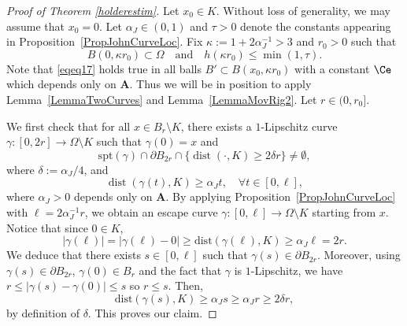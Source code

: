 \documentclass[12pt]{article}
\theoremstyle{definition}
\theoremstyle{remark}
\newtheorem{remark}[theorem]{Remark}
\numberwithin{equation}{section}
\DeclareMathOperator{\dist}{dist}
\newcommand{\dd}{\partial}
\newcommand{\abs}[1]{\lvert #1 \rvert}
\newcommand{\A}{\mathbf{A}}
\newcommand{\spt}{\mathrm{spt}}
\begin{document}
 


\begin{proof}[Proof of Theorem \ref{holderestim}]
    Let $x_0 \in K$. Without loss of generality, we may assume that $x_0 = 0$.
    Let $\alpha_J \in (0,1)$ and $\tau > 0$ denote the constants appearing in Proposition~\ref{PropJohnCurveLoc}.
    Fix $\kappa := 1+2\alpha_J^{-1} > 3$ and $r_0 > 0$ such that
    \begin{equation}
        B(0, \kappa r_0) \subset \Omega \quad \text{and} \quad h(\kappa r_0) \leq \min(1,\tau).
    \end{equation}
    Note that \eqref{eqeq17} holds true in all balls $B' \subset B(x_0,\kappa r_0)$ with a constant $\Ce$ which depends
    only on $\A$.
    Thus we will be in position to apply Lemma~\ref{LemmaTwoCurves} and Lemma~\ref{LemmaMovRig2}.
    Let $r \in (0,r_0]$.

    We first check that for all $x \in B_r \setminus K$,
    there exists a $1$-Lipschitz curve $\gamma\colon[0,2r]\longrightarrow\Omega\setminus K$
    such that $\gamma(0)=x$ and 
    \begin{equation*}
        \spt(\gamma) \cap\dd B_{2r}\cap \{\dist(\cdot,K)\geq 2\delta r\}\neq\emptyset,
    \end{equation*}
    where $\delta := \alpha_J/4$, and
    \begin{equation}
        \label{eqeq35}
        \dist(\gamma(t),K)\geq\alpha_J t,\quad\forall t\in[0,\ell],
    \end{equation}
    where $\alpha_J > 0$ depends only on $\A$. 
    By applying Proposition~\ref{PropJohnCurveLoc} with $\ell = 2 \alpha_J^{-1} r$, we obtain an escape curve $\gamma : [0,\ell] \longrightarrow \Omega \setminus K$ starting from $x$.
    Notice that since $0 \in K$,
    \begin{equation}
        \abs{\gamma(\ell)} = \abs{\gamma(\ell) - 0} \geq \mathrm{dist}(\gamma(\ell),K) \geq \alpha_J \ell = 2r.
    \end{equation}
    We deduce that there exists $s \in [0,\ell]$ such that $\gamma(s) \in \partial B_{2r}$. Moreover, using   $\gamma(s) \in \dd B_{2r}$, $\gamma(0) \in B_r$ and the fact that $\gamma$ is $1$-Lipschitz, we have
    $r \leq \abs{\gamma(s) - \gamma(0)} \leq s$ so $r \leq s$. Then,
    \begin{equation}
        \mathrm{dist}(\gamma(s),K) \geq \alpha_J s \geq \alpha_J r \geq 2 \delta r,
    \end{equation}
    by definition of $\delta$. This proves our claim.


\end{proof}
\end{document}
